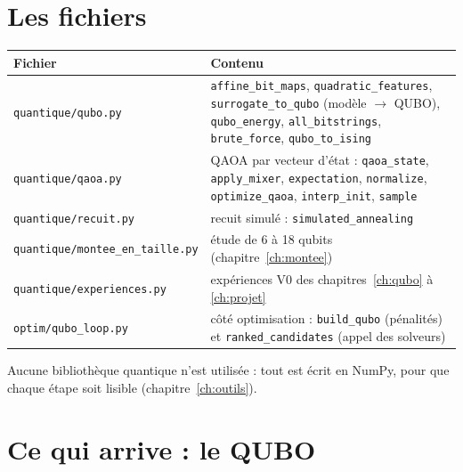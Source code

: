 \section{Les fichiers}
\begin{center}
\renewcommand{\arraystretch}{1.2}
\begin{tabularx}{\linewidth}{>{\raggedright\arraybackslash}p{3.8cm}>{\raggedright\arraybackslash}X}
\toprule
Fichier & Contenu \\
\midrule
\texttt{quantique/qubo.py} & \texttt{affine\_bit\_maps}, \texttt{quadratic\_features}, \texttt{surrogate\_to\_qubo} (modèle $\to$ QUBO), \texttt{qubo\_energy}, \texttt{all\_bitstrings}, \texttt{brute\_force}, \texttt{qubo\_to\_ising} \\
\texttt{quantique/qaoa.py} & QAOA par vecteur d'état : \texttt{qaoa\_state}, \texttt{apply\_mixer}, \texttt{expectation}, \texttt{normalize}, \texttt{optimize\_qaoa}, \texttt{interp\_init}, \texttt{sample} \\
\texttt{quantique/recuit.py} & recuit simulé : \texttt{simulated\_annealing} \\
\texttt{quantique/montee\_en\_taille.py} & étude de 6 à 18 qubits (chapitre~\ref{ch:montee}) \\
\texttt{quantique/experiences.py} & expériences V0 des chapitres~\ref{ch:qubo} à \ref{ch:projet} \\
\texttt{optim/qubo\_loop.py} & côté optimisation : \texttt{build\_qubo} (pénalités) et \texttt{ranked\_candidates} (appel des solveurs) \\
\bottomrule
\end{tabularx}
\end{center}
Aucune bibliothèque quantique n'est utilisée : tout est écrit en NumPy, pour que chaque étape soit lisible (chapitre~\ref{ch:outils}).

\section{Ce qui arrive : le QUBO}
